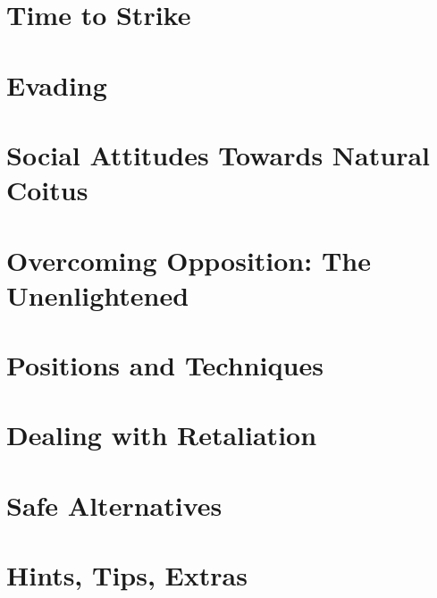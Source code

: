 \chapter{Time to Strike}


\chapter{Evading}


\chapter{Social Attitudes Towards Natural Coitus}


\chapter{Overcoming Opposition: The Unenlightened}


\chapter{Positions and Techniques}


\chapter{Dealing with Retaliation}


\chapter{Safe Alternatives}



\chapter{Hints, Tips, Extras}
